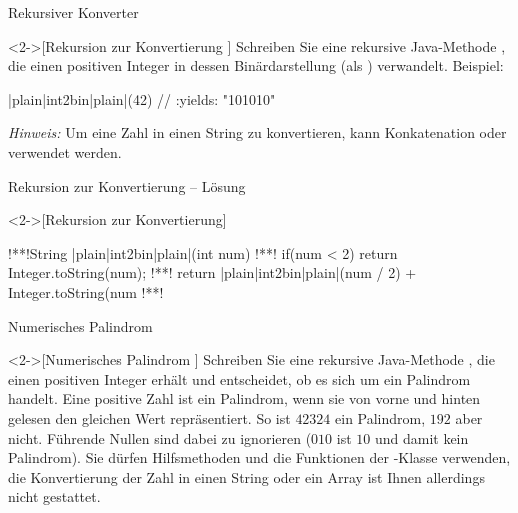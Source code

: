 \begin{frame}[fragile,c]{Rekursiver Konverter}
    \begin{exercise}<2->[Rekursion zur Konvertierung ]
        \pause{}Schreiben Sie eine rekursive Java-Methode , die einen positiven Integer in dessen Binärdarstellung (als ) verwandelt. Beispiel:\pause{}
\begin{plainjava}
|plain|int2bin|plain|(42) // :yields: "101010"
\end{plainjava}
    \pause{}\textit{Hinweis:} Um eine Zahl in einen String zu konvertieren, kann Konkatenation oder  verwendet werden.
    \end{exercise}
\end{frame}

\begin{frame}[fragile,c]{Rekursion zur Konvertierung -- Lösung}
    \begin{solve}<2->[Rekursion zur Konvertierung]
\begin{plainjava}
!**!String |plain|int2bin|plain|(int num){
!**!    if(num < 2) return Integer.toString(num);
!**!    return |plain|int2bin|plain|(num / 2) + Integer.toString(num %
!**!}
\end{plainjava}
    \end{solve}
\end{frame}

\begin{frame}[fragile,c]{Numerisches Palindrom}
    \begin{exercise}<2->[Numerisches Palindrom ]
        \pause{}Schreiben Sie eine rekursive Java-Methode , die einen positiven Integer  erhält und entscheidet, ob es sich um ein Palindrom handelt.\pause{}
        Eine positive Zahl ist ein Palindrom, wenn sie von vorne und hinten gelesen den gleichen Wert repräsentiert. So ist \(42324\) ein Palindrom, \(192\) aber nicht. Führende Nullen sind dabei zu ignorieren (\(010\) ist \(10\) und damit kein Palindrom).
        Sie dürfen Hilfsmethoden und die Funktionen der -Klasse verwenden, die Konvertierung der Zahl in einen String oder ein Array ist Ihnen allerdings nicht gestattet.
    \end{exercise}
\end{frame}

